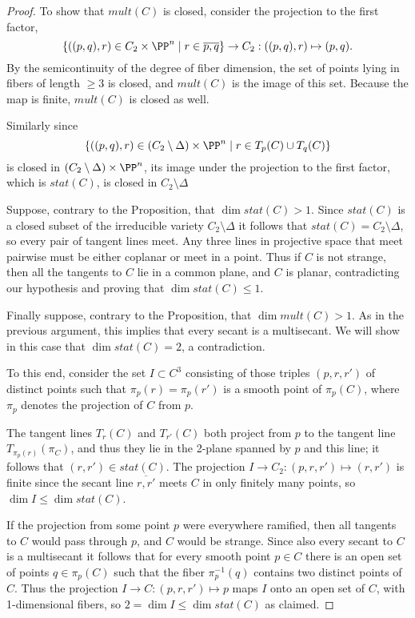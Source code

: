 \begin{proof}
To show that $mult(C)$ is closed, consider the projection to the first factor, 
$$
\{((p,q), r) \in C_2\times \PP^n \mid r \in \overline{p,q}\} \to C_2 : ((p,q),r)\mapsto (p,q).
$$
By the semicontinuity of the degree of fiber dimension, the set of points lying in fibers
of length $\geq 3$ is closed, and $mult(C)$ is the image of this set. Because the map is finite, 
$mult(C)$  is closed as well.

Similarly since 
$$
\{((p,q), r) \in (C_2\setminus \Delta)\times \PP^n \mid r \in T_p(C)\cup T_q(C) \}
$$
is closed in $(C_2\setminus \Delta)\times \PP^n$, its image under the projection to the first factor,
which is $stat(C)$, is closed in $C_2\setminus \Delta$

Suppose, contrary to the Proposition, that $\dim stat(C) >1$. Since $stat(C)$ is a closed subset of the irreducible variety $C_2\setminus \Delta$ it
follows that $stat(C) = C_2\setminus \Delta$, so every pair of tangent lines meet. Any three
lines in projective space that meet pairwise must be either coplanar or meet in a point. Thus if $C$ is not strange,
then all the tangents to $C$ lie in a common plane, and $C$ is planar, contradicting our hypothesis
and proving that $\dim stat(C)\leq 1$.

Finally suppose, contrary to the Proposition,  that $\dim mult(C)>1$. As in the previous argument, this
implies that every secant is a multisecant.  We will show in this case that $\dim stat(C) =2$, a contradiction. 

To this end, consider the set  $I \subset   C^3$ consisting of those triples $(p,r,r')$ of distinct points 
such that $\pi_p(r) = \pi_p(r')$ is a smooth point of $\pi_p(C)$,
where $\pi_p$ denotes the projection of $C$ from $p$.

The tangent lines $T_r(C)$ and $T_{r'}(C)$ both project from $p$ to the tangent line $T_{\pi_p(r)}(\pi_C)$,
and thus they lie in the 2-plane spanned by $p$ and this line; it follows that $(r,r') \in stat(C)$.
The projection $I \to C_2: (p,r,r') \mapsto (r,r')$ is finite since the secant line $\overline{r,r'}$ meets $C$ in only finitely many points, 
so $\dim I \leq \dim stat(C)$.

 If the projection from some point $p$ were everywhere ramified,
then all tangents to $C$ would pass through $p$, and $C$ would be strange.
Since also every secant to $C$ is a multisecant it follows that  for every smooth point $p\in C$ there is an open set of points $q\in \pi_p(C)$ such that
the fiber $\pi_p^{-1}(q)$ contains two distinct points of $C$. Thus the projection $I \to C: (p,r,r') \mapsto p$ maps
$I$ onto an open set of $C$, with 1-dimensional fibers, so $2 = \dim I\leq \dim stat(C)$ as claimed. \end{proof}


